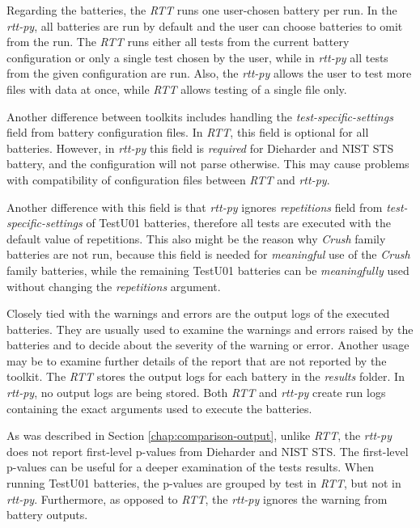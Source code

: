 \documentclass[
  digital,     %
  oneside,     %
  nosansbold,  %
  nocolorbold, %
  nolof,         %
  nolot,         %
]{fithesis4}
\begin{document}
Regarding the batteries, the \emph{RTT} runs one user-chosen battery per run. In the \emph{rtt-py}, all batteries are run by default and the user can choose batteries to omit from the run. The \emph{RTT} runs either all tests from the current battery configuration or only a single test chosen by the user, while in \emph{rtt-py} all tests from the given configuration are run. Also, the \emph{rtt-py} allows the user to test more files with data at once, while \emph{RTT} allows testing of a single file only.

Another difference between toolkits includes handling the \emph{test-specific-settings} field from battery configuration files. In \emph{RTT}, this field is optional for all batteries. However, in \emph{rtt-py} this field is \emph{required} for Dieharder and NIST STS battery, and the configuration will not parse otherwise. This may cause problems with compatibility of configuration files between \emph{RTT} and \emph{rtt-py}.

Another difference with this field is that \emph{rtt-py} ignores \emph{repetitions} field from \emph{test-specific-settings} of TestU01 batteries, therefore all tests are executed with the default value of repetitions. This also might be the reason why \emph{Crush} family batteries are not run, because this field is needed for \emph{meaningful} use of the \emph{Crush} family batteries, while the remaining TestU01 batteries can be \emph{meaningfully} used without changing the \emph{repetitions} argument.


Closely tied with the warnings and errors are the output logs of the executed batteries. They are usually used to examine the warnings and errors raised by the batteries and to decide about the severity of the warning or error. Another usage may be to examine further details of the report that are not reported by the toolkit. The \emph{RTT} stores the output logs for each battery in the \emph{results} folder. In \emph{rtt-py}, no output logs are being stored. Both \emph{RTT} and \emph{rtt-py} create run logs containing the exact arguments used to execute the batteries.

As was described in Section \ref{chap:comparison-output}, unlike \emph{RTT}, the \emph{rtt-py} does not report first-level p-values from Dieharder and NIST STS. The first-level p-values can be useful for a deeper examination of the tests results. When running TestU01 batteries, the p-values are grouped by test in \emph{RTT}, but not in \emph{rtt-py}. Furthermore, as opposed to \emph{RTT}, the \emph{rtt-py} ignores the warning from battery outputs.
\end{document}
